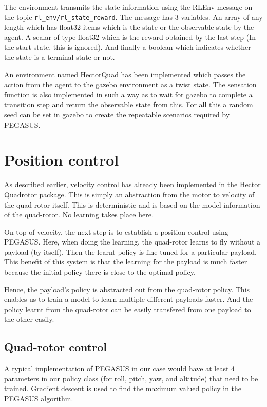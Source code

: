 \documentclass[hidelinks,BTech]{iitmdiss}
\begin{document}
The environment transmits the state information using the RLEnv message on the topic \texttt{rl\_env/rl\_state\_reward}. The message has 3 variables. An array of any length which has float32 items which is the state or the observable state by the agent. A scalar of type float32 which is the reward obtained by the last step (In the start state, this is ignored). And finally a boolean which indicates whether the state is a terminal state or not.

An environment named HectorQuad has been implemented which passes the action from the agent to the gazebo environment as a twist state. The sensation function is also implemented in such a way as to wait for gazebo to complete a transition step and return the observable state from this. For all this a random seed can be set in gazebo to create the repeatable scenarios required by PEGASUS.

\chapter{Position control}

As described earlier, velocity control has already been implemented in the Hector Quadrotor package. This is simply an abstraction from the motor to velocity of the quad-rotor itself. This is deterministic and is based on the model information of the quad-rotor. No learning takes place here.

On top of velocity, the next step is to establish a position control using PEGASUS. Here, when doing the learning, the quad-rotor learns to fly without a payload (by itself). Then the learnt policy is fine tuned for a particular payload. This benefit of this system is that the learning for the payload is much faster because the initial policy there is close to the optimal policy.

Hence, the payload's policy is abstracted out from the quad-rotor policy. This enables us to train a model to learn multiple different payloads faster. And the policy learnt from the quad-rotor can be easily transfered from one payload to the other easily.

\section{Quad-rotor control}

A typical implementation of PEGASUS in our case would have at least 4 parameters in our policy class (for roll, pitch, yaw, and altitude) that need to be trained. Gradient descent is used to find the maximum valued policy in the PEGASUS algorithm.
\end{document}
